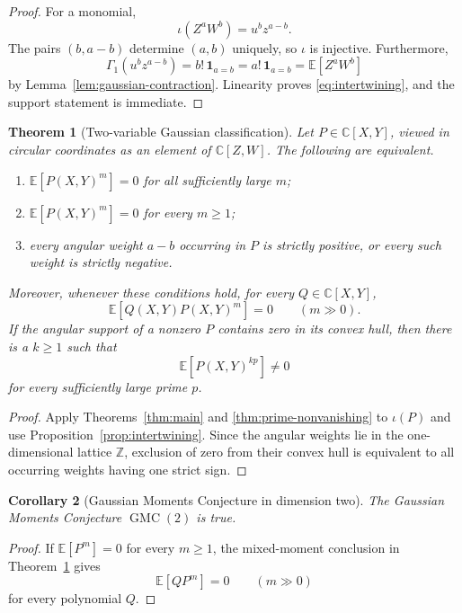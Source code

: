 \documentclass[11pt]{article}
\numberwithin{equation}{section}
\newtheorem{theorem}{Theorem}[section]
\newtheorem{corollary}[theorem]{Corollary}
\theoremstyle{definition}
\theoremstyle{remark}
\newcommand{\C}{\mathbb C}
\newcommand{\Z}{\mathbb Z}
\newcommand{\E}{\mathbb E}
\newcommand{\GMC}{\operatorname{GMC}}
\begin{document}
\begin{proof}
For a monomial,
\[
  \iota(Z^aW^b)=u^bz^{a-b}.
\]
The pairs $(b,a-b)$ determine $(a,b)$ uniquely, so $\iota$ is injective.
Furthermore,
\[
  \Gamma_1(u^bz^{a-b})
  =b!\,\mathbf 1_{a=b}
  =a!\,\mathbf 1_{a=b}
  =\E[Z^aW^b]
\]
by Lemma~\ref{lem:gaussian-contraction}.  Linearity proves
\eqref{eq:intertwining}, and the support statement is immediate.
\end{proof}

\begin{theorem}[Two-variable Gaussian classification]\label{thm:gaussian-main}
Let $P\in\C[X,Y]$, viewed in circular coordinates as an element of
$\C[Z,W]$.  The following are equivalent.
\begin{enumerate}[label=\textup{(\roman*)}]
  \item $\E[P(X,Y)^m]=0$ for all sufficiently large $m$;
  \item $\E[P(X,Y)^m]=0$ for every $m\ge1$;
  \item every angular weight $a-b$ occurring in $P$ is strictly positive,
        or every such weight is strictly negative.
\end{enumerate}
Moreover, whenever these conditions hold, for every $Q\in\C[X,Y]$,
\[
  \E[Q(X,Y)P(X,Y)^m]=0\qquad(m\gg0).
\]
If the angular support of a nonzero $P$ contains zero in its convex hull,
then there is a $k\ge1$ such that
\[
  \E[P(X,Y)^{kp}]\ne0
\]
for every sufficiently large prime $p$.
\end{theorem}

\begin{proof}
Apply Theorems~\ref{thm:main} and \ref{thm:prime-nonvanishing} to
$\iota(P)$ and use Proposition~\ref{prop:intertwining}.  Since the angular
weights lie in the one-dimensional lattice $\Z$, exclusion of zero from
their convex hull is equivalent to all occurring weights having one strict
sign.
\end{proof}

\begin{corollary}[Gaussian Moments Conjecture in dimension two]
The Gaussian Moments Conjecture $\GMC(2)$ is true.
\end{corollary}

\begin{proof}
If $\E[P^m]=0$ for every $m\ge1$, the mixed-moment conclusion in
Theorem~\ref{thm:gaussian-main} gives
\[
  \E[QP^m]=0\qquad(m\gg0)
\]
for every polynomial $Q$.
\end{proof}
\end{document}
